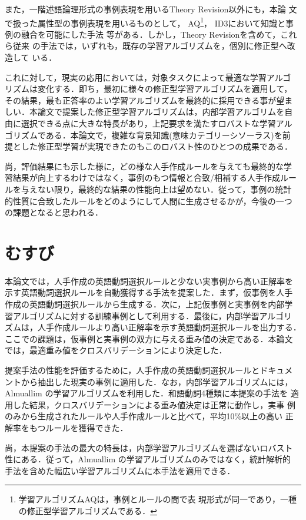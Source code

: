 また，一階述語論理形式の事例表現を用いるTheory Revision以外にも，本論
文で扱った属性型の事例表現を用いるものとして，
AQ\cite{AI-jiten2}\footnote{学習アルゴリズムAQは，事例とルールの間で表
現形式が同一であり，一種の修正型学習アルゴリズムである．}，
ID3\cite{Quinlan86}において知識と事例の融合を可能にした手法
\cite{Tsujino94}等がある．しかし，Theory Revisionを含めて，これら従来
の手法では，いずれも，既存の学習アルゴリズムを，個別に修正型へ改造して
いる．

これに対して，現実の応用においては，対象タスクによって最適な学習アルゴ
リズムは変化する．即ち，最初に様々の修正型学習アルゴリズムを適用して，
その結果，最も正答率のよい学習アルゴリズムを最終的に採用できる事が望ま
しい．本論文で提案した修正型学習アルゴリズムは，内部学習アルゴリムを自
由に選択できる点に大きな特長があり，上記要求を満たすロバストな学習アル
ゴリズムである．本論文で，複雑な背景知識(意味カテゴリーシソーラス)を前
提とした修正型学習が実現できたのもこのロバスト性のひとつの成果である．

尚，評価結果にも示した様に，どの様な人手作成ルールを与えても最終的な学
習結果が向上するわけではなく，事例のもつ情報と合致/相補する人手作成ルー
ルを与えない限り，最終的な結果の性能向上は望めない．従って，事例の統計
的性質に合致したルールをどのようにして人間に生成させるかが，今後の一つ
の課題となると思われる．

\section{むすび}

本論文では，人手作成の英語動詞選択ルールと少ない実事例から高い正解率を
示す英語動詞選択ルールを自動獲得する手法を提案した．まず，仮事例を人手
作成の英語動詞選択ルールから生成する．次に，上記仮事例と実事例を内部学
習アルゴリズムに対する訓練事例として利用する．最後に，内部学習アルゴリ
ズムは，人手作成ルールより高い正解率を示す英語動詞選択ルールを出力する．
ここでの課題は，仮事例と実事例の双方に与える重み値の決定である．本論文
では，最適重み値をクロスバリデーションにより決定した．

提案手法の性能を評価するために，人手作成の英語動詞選択ルールとドキュメ
ントから抽出した現実の事例に適用した．なお，内部学習アルゴリズムには，
Almuallim の学習アルゴリズムを利用した．和語動詞4種類に本提案の手法を
適用した結果，クロスバリデーションによる重み値決定は正常に動作し，実事
例のみから生成されたルールや人手作成ルールと比べて，平均10\%以上の高い
正解率をもつルールを獲得できた．

尚，本提案の手法の最大の特長は，内部学習アルゴリズムを選ばないロバスト
性にある．従って，Almuallim の学習アルゴリズムのみではなく，統計解析的
手法を含めた幅広い学習アルゴリズムに本手法を適用できる．

